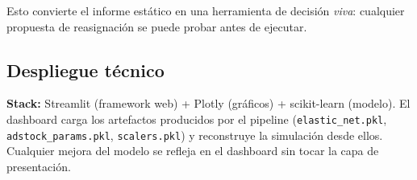 Esto convierte el informe estático en una herramienta de decisión \textit{viva}: cualquier propuesta de reasignación se puede probar antes de ejecutar.

\subsection{Despliegue técnico}

\begin{decisionbox}
\textbf{Stack:} Streamlit (framework web) + Plotly (gráficos) + scikit-learn (modelo). El dashboard carga los artefactos producidos por el pipeline (\texttt{elastic\_net.pkl}, \texttt{adstock\_params.pkl}, \texttt{scalers.pkl}) y reconstruye la simulación desde ellos. Cualquier mejora del modelo se refleja en el dashboard sin tocar la capa de presentación.
\end{decisionbox}
